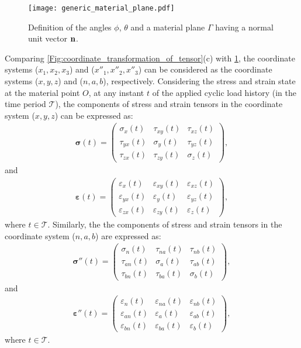 \begin{figure}
\centering
\texttt{[image: generic\_material\_plane.pdf]}
\caption{Definition of the angles $\phi$, $\theta$ and a material plane $\Gamma$ having a normal unit vector ${\bf{n}}$.}
\label{Fig:generic_material_plane}
\end{figure}
Comparing \ref{Fig:coordinate_transformation_of_tensor}(c) with \ref{Fig:generic_material_plane}, the coordinate systems ($x_1,x_2,x_3$) and ($x''_1,x''_2,x''_3$) can be considered as the coordinate systems ($x,y,z$) and ($n,a,b$), respectively. Considering the stress and strain state at the material point $O$, at any instant $t$ of the applied cyclic load history (in the time period $\mathscr{T}$), the components of stress and strain tensors in the coordinate system ($x,y,z$) can be expressed as:
\begin{eqnarray}
{\bm{\sigma }}(t) = \left( {\begin{array}{*{20}{c}}
{{\sigma _{x}}(t)}&{{\tau _{xy}}(t)}&{{\tau _{xz}}(t)}\\
{{\tau _{yx}}(t)}&{{\sigma _{y}}(t)}&{{\tau _{yz}}(t)}\\
{{\tau _{zx}}(t)}&{{\tau _{zy}}(t)}&{{\sigma _{z}}(t)}
\end{array}} \right),
\end{eqnarray}
and
\begin{eqnarray}
{\bm{\varepsilon }}(t) = \left( {\begin{array}{*{20}{c}}
{{\varepsilon _{x}}(t)}&{{\varepsilon _{xy}}(t)}&{{\varepsilon _{xz}}(t)}\\
{{\varepsilon _{yx}}(t)}&{{\varepsilon _{y}}(t)}&{{\varepsilon _{yz}}(t)}\\
{{\varepsilon _{zx}}(t)}&{{\varepsilon _{zy}}(t)}&{{\varepsilon _{z}}(t)}
\end{array}} \right),
\end{eqnarray}
where $t \in \mathscr{T}$.
Similarly, the the components of stress and strain tensors in the coordinate system ($n,a,b$) are expressed as:
\begin{eqnarray}
{\bm{\sigma ''}}(t) = \left( {\begin{array}{*{20}{c}}
{{\sigma _{{{n}}}}(t)}&{{\tau _{{{na}}}}(t)}&{{\tau _{{{nb}}}}(t)}\\
{{\tau _{{{an}}}}(t)}&{{\sigma _{{{a}}}}(t)}&{{\tau _{{{ab}}}}(t)}\\
{{\tau _{{{bn}}}}(t)}&{{\tau _{{{ba}}}}(t)}&{{\sigma _{{{b}}}}(t)}
\end{array}} \right),
\end{eqnarray}
and
\begin{eqnarray}
{\bm{\varepsilon ''}}(t) = \left( {\begin{array}{*{20}{c}}
{{\varepsilon _{{{n}}}}(t)}&{{\varepsilon _{{{na}}}}(t)}&{{\varepsilon _{{{nb}}}}(t)}\\
{{\varepsilon _{{{an}}}}(t)}&{{\varepsilon _{{{a}}}}(t)}&{{\varepsilon _{{{ab}}}}(t)}\\
{{\varepsilon _{{{bn}}}}(t)}&{{\varepsilon _{{{ba}}}}(t)}&{{\varepsilon _{{{b}}}}(t)}
\end{array}} \right),
\end{eqnarray}
where $t \in \mathscr{T}$.

